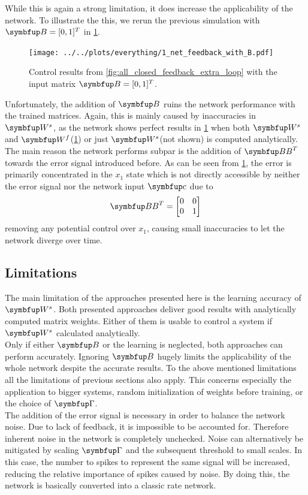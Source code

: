 While this is again a strong limitation, it does increase the applicability of the network. To illustrate the this, we rerun the previous simulation with $\bmu{B} = [0,1]^T$ in \cref{fig:all_closed_1_net_with_b}.
\begin{figure}
	\centering
	\texttt{[image: ../../plots/everything/1\_net\_feedback\_with\_B.pdf]}
	\caption{Control results from \cref{fig:all_closed_feedback_extra_loop} with the input matrix $\bmu{B} =[0,1]^T$.}
	\label{fig:all_closed_1_net_with_b}
\end{figure}
Unfortunately, the addition of $\bmu{B}$ ruins the network performance with the trained matrices. Again, this is mainly caused by inaccuracies in $\bmu{W}^s$, as the network shows perfect results in \cref{fig:all_closed_1_net_with_b} when both $\bmu{W}^s$ and $\bmu{W}^f$(\cref{fig:all_closed_1_net_with_b}) or just $\bmu{W}^s$(not shown) is computed analytically.\\
The main reason the network performs subpar is the addition of $\bmu{BB}^T$ towards the error signal introduced before. As can be seen from \cref{fig:all_closed_1_net_with_b}, the error is primarily concentrated in the $x_1$ state which is not directly accessible by neither the error signal nor the network input $\bmu{c}$ due to
\begin{equation}
	\bmu{BB}^T = \begin{bmatrix}
	0&0\\
	0&1\\
	\end{bmatrix}
\end{equation}
removing any potential control over $x_1$, causing small inaccuracies to let the network diverge over time.
\subsection{Limitations}
The main limitation of the approaches presented here is the learning accuracy of $\bmu{W}^s$.
Both presented approaches deliver good results with analytically computed matrix weights. Either of them is usable to control a system if $\bmu{W}^s$ calculated analytically.\\
Only if either $\bmu{B}$ or the learning is neglected, both approaches can perform accurately. Ignoring $\bmu{B}$ hugely limits the applicability of the whole network despite the accurate results. To the above mentioned limitations all the limitations of previous sections also apply. This concerns especially the application to bigger systems, random initialization of weights before training, or the choice of $\bmu{\Gamma}$.\\
The addition of the error signal is necessary in order to balance the network noise. Due to lack of feedback, it is impossible to be accounted for. Therefore inherent noise in the network is completely unchecked.
Noise can alternatively be mitigated by scaling $\bmu{\Gamma}$ and the subsequent threshold to small scales. In this case, the number to spikes to represent the same signal will be increased, reducing the relative importance of spikes caused by noise. By doing this, the network is basically converted into a classic rate network.\\
